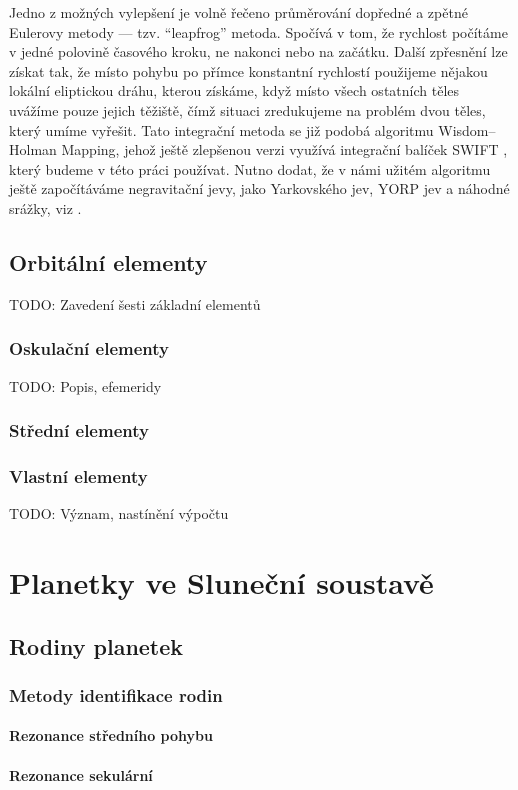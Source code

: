 \documentclass[A4paper, 12pt, oneside]{book}
\begin{document}
Jedno z možných vylepšení je volně řečeno průměrování dopředné a zpětné Eulerovy metody --- tzv. \enquote{leapfrog} metoda. Spočívá v tom, že rychlost počítáme v jedné polovině časového kroku, ne nakonci nebo na začátku. Další zpřesnění lze získat tak, že místo pohybu po přímce konstantní rychlostí použijeme nějakou lokální eliptickou dráhu, kterou získáme, když místo všech ostatních těles uvážíme pouze jejich těžiště, čímž situaci zredukujeme na problém dvou těles, který umíme vyřešit. Tato integrační metoda se již podobá algoritmu Wisdom--Holman Mapping, jehož ještě zlepšenou verzi využívá integrační balíček SWIFT \cite{levison}, který budeme v této práci používat. Nutno dodat, že v námi užitém algoritmu ještě započítáváme negravitační jevy, jako Yarkovského jev, YORP jev a náhodné srážky, viz \cite{broz11}.

\section{Orbitální elementy} \label{sec:orbelem}
TODO: Zavedení šesti základní elementů
\subsection{Oskulační elementy}
TODO: Popis, efemeridy
\subsection{Střední elementy}
\subsection{Vlastní elementy}
TODO: Význam, nastínění výpočtu

\chapter{Planetky ve Sluneční soustavě}
\section{Rodiny planetek}
\subsection{Metody identifikace rodin}
\subsubsection{Rezonance středního pohybu}
\subsubsection{Rezonance sekulární}
\end{document}
